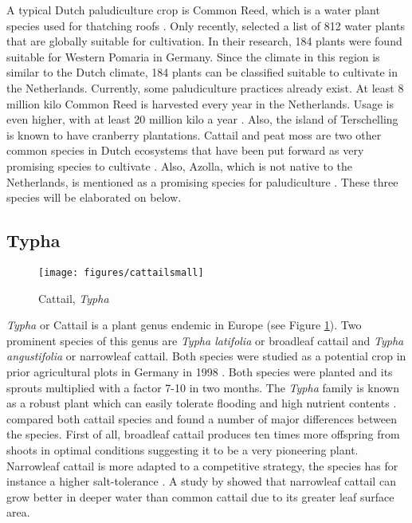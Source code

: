 \documentclass[a4paper,12pt]{scrbook}
\begin{document}
A typical Dutch paludiculture crop is Common Reed, which is a water plant species used for thatching roofs \citep{wichtmann2016paludiculture}. Only recently, \citet{abel2013database} selected a list of 812 water plants that are globally suitable for cultivation. In their research, 184 plants were found suitable for Western Pomaria in Germany. Since the climate in this region is similar to the Dutch climate, 184 plants can be classified suitable to cultivate in the Netherlands. Currently, some paludiculture practices already exist. At least 8 million kilo Common Reed is harvested every year in the Netherlands. Usage is even higher, with at least 20 million kilo a year \citep{wichtmann2016paludiculture}. Also, the island of Terschelling is known to have cranberry plantations. Cattail and peat moss are two other common species in Dutch ecosystems that have been put forward as very promising species to cultivate \citep{abel2013database, van2013werk}. Also, Azolla, which is not native to the Netherlands, is mentioned as a promising species for paludiculture \citep{abel2013database, van2013werk}. These three species will be elaborated on below.


\subsection{Typha}

\begin{figure}
    \centering
    \texttt{[image: figures/cattailsmall]} 
    \caption{Cattail, \textit{Typha}}
    \label{fig:cattail}
\end{figure}


\textit{Typha} or Cattail is a plant genus endemic in Europe (see Figure \ref{fig:cattail}). Two prominent species of this genus are \textit{Typha latifolia} or broadleaf cattail and \textit{Typha angustifolia} or narrowleaf cattail. Both species were studied as a potential crop in prior agricultural plots in Germany in 1998 \citep{wild2001cultivation}. Both species were planted and its sprouts multiplied with a factor 7-10 in two months. The \textit{Typha} family is known as a robust plant which can easily tolerate flooding and high nutrient contents \citep{wild2001cultivation}. \citet{heinz2011population} compared both cattail species and found a number of major differences between the species. First of all, broadleaf cattail produces ten times more offspring from shoots in optimal conditions suggesting it to be a very pioneering plant. Narrowleaf cattail is more adapted to a competitive strategy, the species has for instance a higher salt-tolerance \citep{heinz2011population}. A study by \citet{grace1982niche} showed that narrowleaf cattail can grow better in deeper water than common cattail due to its greater leaf surface area.
\end{document}
